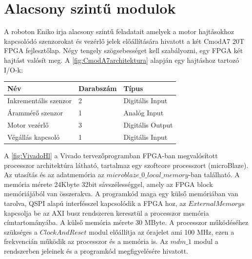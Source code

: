 
\section{Alacsony szintű modulok} 

A roboton  Eniko irja alacsony szintű feladatait amelyek a motor hajtásokhoz kapcsolódó szenzorokat és vezérlő jelek előállítására hivatott a két CmodA7 20T FPGA fejlesztőlap. Négy tengely szögsebességet kell szabályozni, egy FPGA két hajtást valósít meg. A \ref{fig:CmodA7architektura} alapján egy hajtáshoz tartozó I/O-k:

\begin{table}[H]
\center
\begin{tabular}{lll}
\hline Név                            & Darabszám              & Típus  \\ \hline
Inkrementális szenzor           & 2           & Digitális Input \\
Árammérő szenzor                & 1                  & Analóg Input \\
Motor vezérlő                   & 3                  & Digitális Output \\
Végállás kapcsoló                 & 1                  & Digitális Input        
\end{tabular}
\end{table}




\renewcommand{\img}{SajatRobot/SzerkAbrak/cmoda7modulok.jpg}
\renewcommand{\sources}{*}
\renewcommand{\captionn}{CmodA7 FPGA-ban kialakított architektúra amely a szenzorok és motor hajtások jeleinek feldolgozását és előállítását valósítja meg }
\renewcommand{\figlabel}{CmodA7architektura}



A \ref{fig:VivadoHl} a Vivado tervezőprogramban FPGA-ban megvalósított processzor architektúra látható, tartalmaz egy szoftcore processzort (microBlaze). Az utasítás és az adatmemória az $microblaze\_0\_local\_memory$-ban található. A memória mérete 24Kbyte 32bit sávszélességgel, amely az FPGA block memóriájából van összerakva. A programkód maga egy külső memóriában van tarolva, QSPI alapú interfésszel kapcsolódik a FPGA hoz, az $ExternalMemorys$ kapcsolja be az AXI busz rendszeren keresztül a processzor memória címtartományába. A külső memória mérete 30 MByte. A processzor működéséhez szükséges a $ClockAndReset$ modul előállítja az órajelet ami 100 MHz, ezen a frekvencián működik az processzor és a memória is. Az $mdm\_1$ modul a rendszerben jeleinek és a programkód megfigyelésére hivatott.

